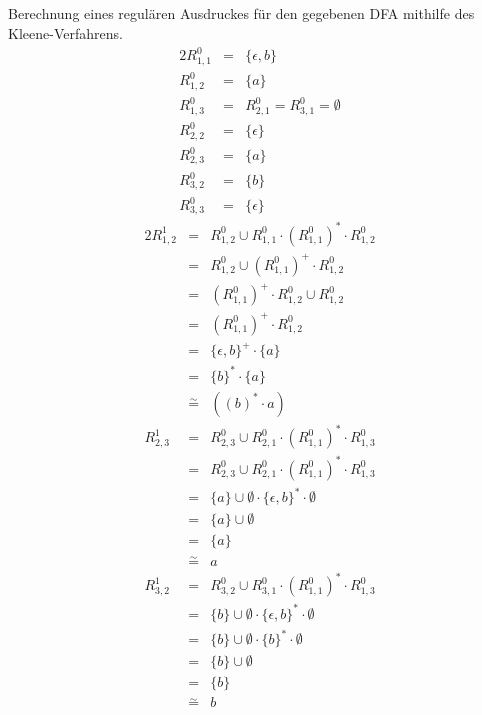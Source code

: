 \documentclass[10pt,a4paper,oneside,ngerman,numbers=noenddot]{scrartcl}
\begin{document}
\subsection{} %
Berechnung eines regulären Ausdruckes für den gegebenen DFA mithilfe des Kleene-Verfahrens.
\begin{alignat*}{2}
R_{1,1}^{0} &=& \{\epsilon , b\} \\
R_{1,2}^{0} &=& \{a\} \\
R_{1,3}^{0} &=& R_{2,1}^{0} = R_{3,1}^{0} = \emptyset \\
R_{2,2}^{0} &=& \{\epsilon \} \\
R_{2,3}^{0} &=& \{a\} \\
R_{3,2}^{0} &=& \{b\} \\
R_{3,3}^{0} &=& \{\epsilon \} \end{alignat*}
\begin{alignat*}{2}
R_{1,2}^{1} &=& R_{1,2}^{0} \cup R_{1,1}^{0} \cdot (R_{1,1}^{0})^{*} \cdot R_{1,2}^{0} \\
&=& R_{1,2}^{0} \cup (R_{1,1}^{0})^{+} \cdot R_{1,2}^{0} \\
&=& (R_{1,1}^{0})^{+} \cdot R_{1,2}^{0} \cup R_{1,2}^{0} \\
&=& (R_{1,1}^{0})^{+} \cdot R_{1,2}^{0} \\
&=& \{\epsilon , b \}^{+} \cdot \{a\} \\
&=& \{b\}^{*} \cdot \{a\} \\
&\overset{\sim}{=}& ((b)^{*} \cdot a) \\
%
R_{2,3}^{1} &=& R_{2,3}^{0} \cup R_{2,1}^{0} \cdot (R_{1,1}^{0})^{*} \cdot R_{1,3}^{0} \\
&=& R_{2,3}^{0} \cup R_{2,1}^{0} \cdot (R_{1,1}^{0})^{*} \cdot R_{1,3}^{0} \\
&=& \{a\} \cup \emptyset \cdot \{\epsilon , b\}^{*} \cdot \emptyset \\
&=& \{a\} \cup \emptyset \\
&=& \{a\} \\
&\overset{\sim}{=}& a \\
%
R_{3,2}^{1} &=& R_{3,2}^{0} \cup R_{3,1}^{0} \cdot (R_{1,1}^{0})^{*} \cdot R_{1,3}^{0} \\
&=& \{b\} \cup \emptyset \cdot \{\epsilon , b\}^{*} \cdot \emptyset \\
&=& \{b\} \cup \emptyset \cdot \{b\}^{*} \cdot \emptyset \\
&=& \{b\} \cup \emptyset \\
&=& \{b\} \\
&\overset{\sim}{=}& b \\

\end{alignat*}
\end{document}
